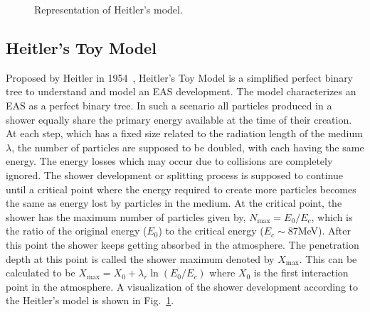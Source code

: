 \begin{figure}[t!]
    \centering
    \hfill
    \caption{Representation of Heitler's model.}
    \label{fig:EAS_toy_model}
\end{figure}

\subsection{Heitler's Toy Model}
\label{sec:Dev_Heitler}

Proposed by Heitler in 1954~\cite{heitler1984quantum}, Heitler's Toy Model is a simplified perfect binary tree to understand and model an EAS development. The model characterizes an EAS as a perfect binary tree. In such a scenario all particles produced in a shower equally share the primary energy available at the time of their creation. At each step, which has a fixed size related to the radiation length of the medium $\lambda$, the number of particles are supposed to be doubled, with each having the same energy. The energy losses which may occur due to collisions are completely ignored. The shower development or splitting process is supposed to continue until a critical point where the energy required to create more particles becomes the same as energy lost by particles in the medium. At the critical point, the shower has the maximum number of particles given by, $N_{\text{max}} = E_0/E_c$, which is the ratio of the original energy ($E_0$) to the critical energy ($E_c \sim 87$MeV). After this point the shower keeps getting absorbed in the atmosphere. The penetration depth at this point is called the shower maximum denoted by $X_{\text{max}}$. This can be calculated to be $X_{\text{max}} = X_0 + \lambda_r \ln(E_0/E_c)$ where $X_0$ is the first interaction point in the atmosphere. A visualization of the shower development according to the Heitler's model is shown in Fig.~\ref{fig:EAS_toy_model}.

